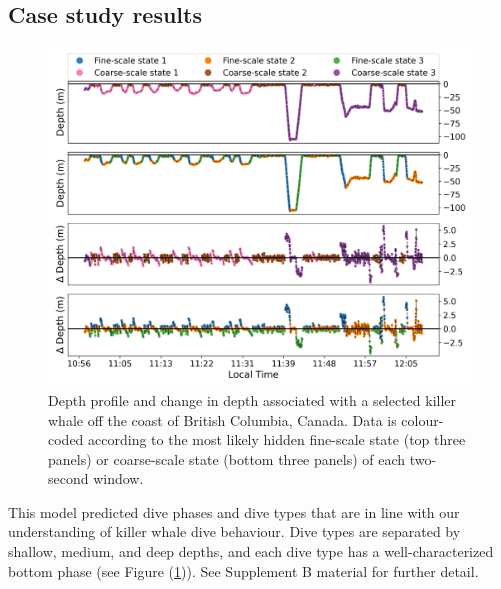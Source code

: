 \subsection{Case study results}
%
\begin{figure}
    \centering
    \includegraphics[width=6.5in]{plt/decoded_dives_kw_I107_K_3_3_nWhales_8.png}
    \caption{Depth profile and change in depth associated with a selected killer whale off the coast of British Columbia, Canada. Data is colour-coded according to the most likely hidden fine-scale state (top three panels) or coarse-scale state (bottom three panels) of each two-second window.}
    \label{fig:data}
\end{figure}
%
This model predicted dive phases and dive types that are in line with our understanding of killer whale dive behaviour. Dive types are separated by shallow, medium, and deep depths, and each dive type has a well-characterized bottom phase (see Figure (\ref{fig:data})). See Supplement B material for further detail.

